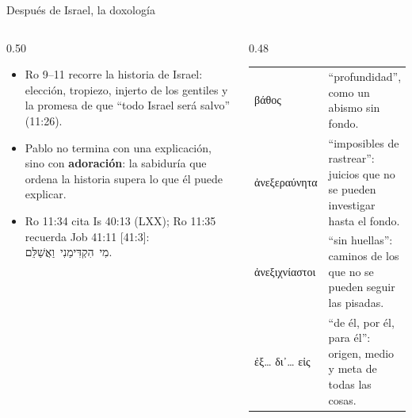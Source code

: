 \documentclass[hyperref={bookmarks=false},aspectratio=169]{beamer}
\newcommand{\heb}[1]{\mbox{\foreignlanguage{hebrew}{#1}}}
\newcommand{\grc}[1]{\foreignlanguage{ancientgreek}{#1}}
\newcommand{\destacar}[1]{\textbf{\textcolor{azul}{#1}}}
\begin{document}
\begin{frame}{Después de Israel, la doxología}
\begin{columns}[c,onlytextwidth]
\begin{column}{0.50\textwidth}\small
\begin{itemize}
\item Ro 9--11 recorre la historia de Israel: elección, tropiezo, injerto de los gentiles y la promesa de que ``todo Israel será salvo'' (11:26).
\item Pablo no termina con una explicación, sino con \destacar{adoración}: la sabiduría que ordena la historia supera lo que él puede explicar.
\item Ro 11:34 cita Is 40:13 (LXX); Ro 11:35 recuerda Job 41:11 [41:3]: \heb{מִי הִקְדִּימַנִי וַאֲשַׁלֵּם}.
\end{itemize}
\end{column}
\begin{column}{0.48\textwidth}
\scriptsize\renewcommand{\arraystretch}{1.2}
\begin{tabular}{@{}>{\RaggedRight\arraybackslash}p{1.5cm}>{\RaggedRight\arraybackslash}p{3.9cm}@{}}
\toprule
\grc{βάθος} & ``profundidad'', como un abismo sin fondo. \\
\grc{ἀνεξεραύνητα} & ``imposibles de rastrear'': juicios que no se pueden investigar hasta el fondo. \\
\grc{ἀνεξιχνίαστοι} & ``sin huellas'': caminos de los que no se pueden seguir las pisadas. \\
\grc{ἐξ\ldots{} δι᾽\ldots{} εἰς} & ``de él, por él, para él'': origen, medio y meta de todas las cosas. \\
\bottomrule
\end{tabular}
\end{column}
\end{columns}
\end{frame}
\end{document}
